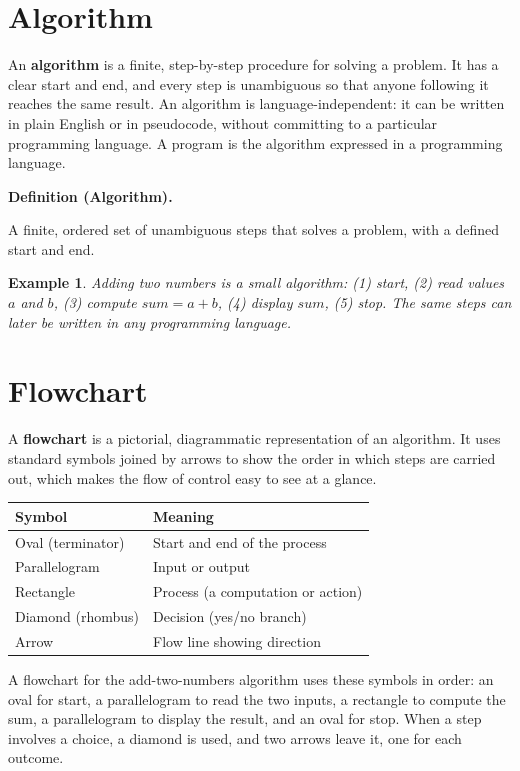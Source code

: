 \documentclass[11pt]{article}
\newtheorem{example}{Example}[section]
\newenvironment{definitionbox}[1]{%
  \par\noindent\textbf{Definition (#1).}\ \itshape
}{\par\vspace{0.3em}}
\begin{document}
\section{Algorithm}
An \textbf{algorithm} is a finite, step-by-step procedure for solving a
problem. It has a clear start and end, and every step is unambiguous so that
anyone following it reaches the same result. An algorithm is
language-independent: it can be written in plain English or in pseudocode,
without committing to a particular programming language. A program is the
algorithm expressed in a programming language.

\begin{definitionbox}{Algorithm}
A finite, ordered set of unambiguous steps that solves a problem, with a
defined start and end.
\end{definitionbox}

\begin{example}
Adding two numbers is a small algorithm: (1) start, (2) read values $a$ and
$b$, (3) compute $sum = a + b$, (4) display $sum$, (5) stop. The same steps
can later be written in any programming language.
\end{example}

\section{Flowchart}
A \textbf{flowchart} is a pictorial, diagrammatic representation of an
algorithm. It uses standard symbols joined by arrows to show the order in
which steps are carried out, which makes the flow of control easy to see at a
glance.

\begin{center}
\begin{tabular}{p{}p{}}
\toprule
\textbf{Symbol} & \textbf{Meaning} \\
\midrule
Oval (terminator) & Start and end of the process \\
Parallelogram & Input or output \\
Rectangle & Process (a computation or action) \\
Diamond (rhombus) & Decision (yes/no branch) \\
Arrow & Flow line showing direction \\
\bottomrule
\end{tabular}
\end{center}

A flowchart for the add-two-numbers algorithm uses these symbols in order: an
oval for start, a parallelogram to read the two inputs, a rectangle to compute
the sum, a parallelogram to display the result, and an oval for stop. When a
step involves a choice, a diamond is used, and two arrows leave it, one for
each outcome.
\end{document}
